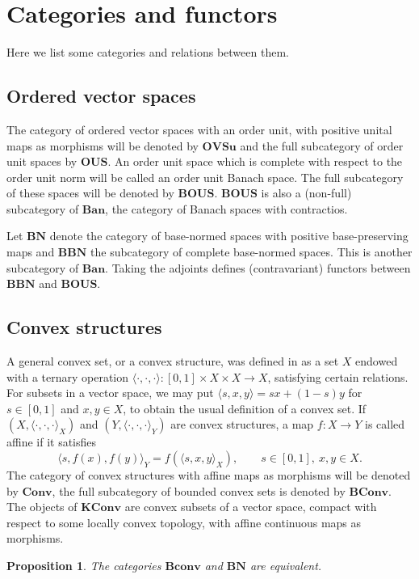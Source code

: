 \documentclass[12pt]{article}
\newtheorem{prop}{Proposition}
\newcommand{\<}{\langle}
\def\>{\rangle}
\newcommand{\ct}[1]{\mathbf{#1}}
\begin{document}
\section{Categories and functors}

Here we list some categories and relations between them. 

\subsection{Ordered vector spaces}

The category of ordered vector spaces with an order unit, with positive unital maps as morphisms will be denoted by $\ct{OVSu}$ and the full subcategory of order unit 
spaces by  $\ct{OUS}$. An order unit space which is complete with respect to the order unit norm will be called an order unit Banach space. The full subcategory of these spaces will be denoted by $\ct{BOUS}$. $\ct{BOUS}$ is also a (non-full) subcategory of $\ct{Ban}$, the category of Banach spaces with contractios.


Let $\ct{BN}$ denote the category of base-normed spaces with positive base-preserving maps and $\ct{BBN}$ the subcategory of complete base-normed spaces. 
 This is another subcategory of $\ct{Ban}$. Taking the adjoints defines  (contravariant) functors between  $\ct{BBN}$ and $\ct{BOUS}$. 

\subsection{Convex structures}

A general convex set, or a convex structure, was defined in \cite{gudder} as a set $X$ endowed with a ternary operation $\<\cdot,\cdot,\cdot\>: [0,1]\times X\times X\to X$,
 satisfying certain relations. For subsets in a vector space, we may put $\<s,x,y\>=sx+(1-s)y$ for $s\in [0,1]$ and $x,y\in X$, to obtain the usual definition of a convex set.  If $(X,\<\cdot,\cdot,\cdot\>_X)$ and $(Y,\<\cdot,\cdot,\cdot\>_Y)$ are convex structures, a map $f:X\to Y$ is called affine if it satisfies
\[
\<s,f(x),f(y)\>_Y=f(\<s,x,y\>_X),\qquad s\in [0,1],\ x,y\in X.
\]
The category of convex structures with affine maps as morphisms will be denoted by $\ct{Conv}$, the full subcategory of bounded convex sets is denoted by $\ct{BConv}$. The objects of $\ct{KConv}$ are convex subsets of a vector space,  compact with respect to some locally convex topology, with affine continuous maps as morphisms.

\begin{prop} The categories $\ct{Bconv}$ and $\ct{BN}$ are equivalent.

\end{prop}
\end{document}

